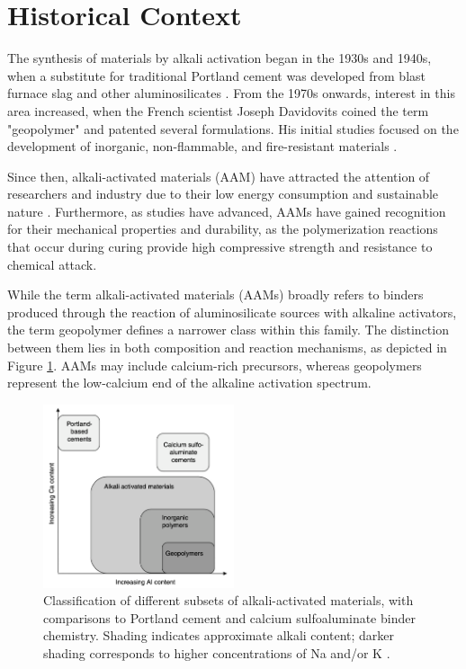 \section{Historical Context}

The synthesis of materials by alkali activation began in the 1930s and 1940s, when a substitute for traditional Portland cement was developed from blast furnace slag and other aluminosilicates \cite{pachecotorgal2014handbook}.
From the 1970s onwards, interest in this area increased, when the French scientist Joseph Davidovits coined the term "geopolymer" and patented several formulations. His initial studies focused on the development of inorganic, non-flammable, and fire-resistant materials \cite{provis2009geopolymers}.


Since then, alkali-activated materials (AAM) have attracted the attention of researchers and industry due to their low energy consumption and sustainable nature \cite{qin2022onepart}.
Furthermore, as studies have advanced, AAMs have gained recognition for their mechanical properties and durability, as the polymerization reactions that occur during curing provide high compressive strength and resistance to chemical attack.


While the term alkali-activated materials (AAMs) broadly refers to binders produced through the reaction of aluminosilicate sources with alkaline activators, the term geopolymer defines a narrower class within this family.
The distinction between them lies in both composition and reaction mechanisms, as depicted in Figure \ref{fig:al_ca_aam}.
AAMs may include calcium-rich precursors, whereas geopolymers represent the low-calcium end of the alkaline activation spectrum.

\begin{figure}[H]
  \centering
  \includegraphics[width=0.5\textwidth]{Cap2/images/al_ca_aam.png}
  \caption{Classification of different subsets of alkali-activated materials, with comparisons to Portland cement and
calcium sulfoaluminate binder chemistry. Shading
indicates approximate alkali content; darker shading
corresponds to higher concentrations of Na and/or K \cite{rakhimova2019reaction}.}
  \label{fig:al_ca_aam}
\end{figure}


